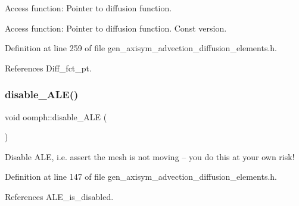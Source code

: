 Access function\+: Pointer to diffusion function. 

Access function\+: Pointer to diffusion function. Const version. 

Definition at line 259 of file gen\+\_\+axisym\+\_\+advection\+\_\+diffusion\+\_\+elements.\+h.



References Diff\+\_\+fct\+\_\+pt.

\mbox{\label{namespaceoomph_aac9e9b485dd3b82c6c0b42989017c57f}} 
\subsubsection{\texorpdfstring{disable\+\_\+\+A\+L\+E()}{disable\_ALE()}}
{\footnotesize\ttfamily void oomph\+::disable\+\_\+\+A\+LE (\begin{DoxyParamCaption}{ }\end{DoxyParamCaption})}



Disable A\+LE, i.\+e. assert the mesh is not moving -- you do this at your own risk! 



Definition at line 147 of file gen\+\_\+axisym\+\_\+advection\+\_\+diffusion\+\_\+elements.\+h.



References A\+L\+E\+\_\+is\+\_\+disabled.

\mbox{\label{namespaceoomph_a1302011e0b30d149dd485a356f901289}} 
